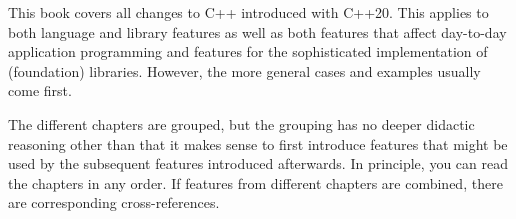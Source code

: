 This book covers all changes to C++ introduced with C++20. This applies to both language and library features as well as both features that affect day-to-day application programming and features for the sophisticated implementation of (foundation) libraries. However, the more general cases and examples usually come first.

The different chapters are grouped, but the grouping has no deeper didactic reasoning other than that it makes sense to first introduce features that might be used by the subsequent features introduced afterwards. In principle, you can read the chapters in any order. If features from different chapters are combined, there are corresponding cross-references.